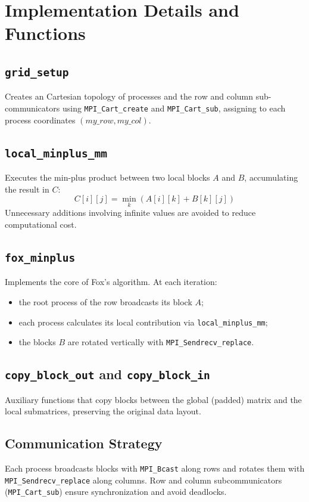 \documentclass[10pt,a4paper]{article}
\begin{document}
\section{Implementation Details and Functions}

\subsection{\texttt{grid\_setup}}
Creates an Cartesian topology of processes and the row and column sub-communicators using \texttt{MPI\_Cart\_create} and \texttt{MPI\_Cart\_sub}, 
assigning to each process coordinates \((my\_row, my\_col)\).

\subsection{\texttt{local\_minplus\_mm}}
Executes the min-plus product between two local blocks \(A\) and \(B\), accumulating the result in \(C\):
\[
C[i][j] = \min_k(A[i][k] + B[k][j])
\]
Unnecessary additions involving infinite values are avoided to reduce computational cost.

\subsection{\texttt{fox\_minplus}}
Implements the core of Fox's algorithm.  
At each iteration:
\begin{itemize}
  \item the root process of the row broadcasts its block \(A\);
  \item each process calculates its local contribution via \texttt{local\_minplus\_mm};
  \item the blocks \(B\) are rotated vertically with \texttt{MPI\_Sendrecv\_replace}.
\end{itemize}

\subsection{\texttt{copy\_block\_out} and \texttt{copy\_block\_in}}
Auxiliary functions that copy blocks between the global (padded) matrix and the local submatrices, preserving the original data layout.

\subsection*{Communication Strategy}
Each process broadcasts blocks with \texttt{MPI\_Bcast} along rows and rotates them with \texttt{MPI\_Sendrecv\_replace} along columns.  
Row and column subcommunicators (\texttt{MPI\_Cart\_sub}) ensure synchronization and avoid deadlocks.
\end{document}
